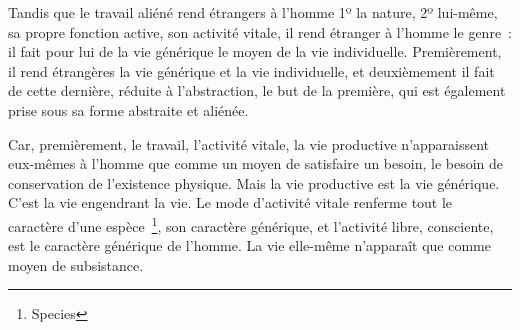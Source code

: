 \documentclass[french,twoside]{book} %
\begin{document}
Tandis que le travail aliéné rend étrangers à l’homme 1º la nature, 2º lui-même, sa propre fonction active, son activité vitale, il rend étranger à l’homme le genre : il fait pour lui de la vie générique le moyen de la vie individuelle. Premièrement, il rend étrangères la vie générique et la vie individuelle, et deuxièmement il fait de cette dernière, réduite à l’abstraction, le but de la première, qui est également prise sous sa forme abstraite et aliénée.\par
Car, premièrement, le travail, l’activité vitale, la vie productive n’apparaissent eux-mêmes à l’homme que comme un moyen de satisfaire un besoin, le besoin de conservation de l’existence physique. Mais la vie productive est la vie générique. C’est la vie engendrant la vie. Le mode d’activité vitale renferme tout le caractère d’une espèce \footnote{Species}, son caractère générique, et l’activité libre, consciente, est le caractère générique de l’homme. La vie elle-même n’apparaît que comme moyen de subsistance.\par
\end{document}
